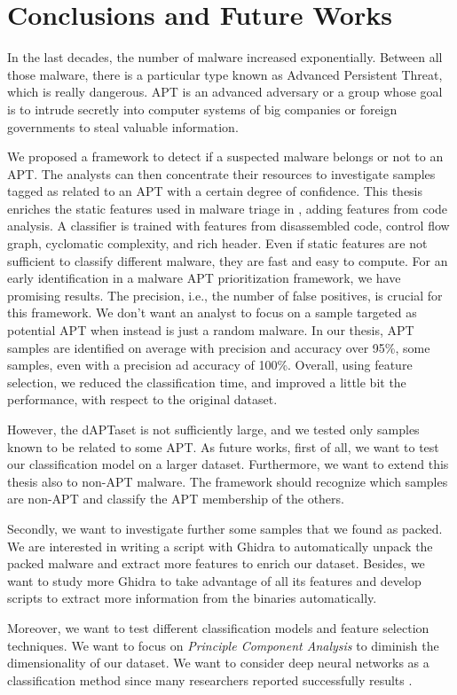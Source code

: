 \chapter{Conclusions and Future Works}
\label{ch:future}

In the last decades, the number of malware increased exponentially. Between all those malware, there is a particular type known as Advanced Persistent Threat, which is really dangerous. APT is an advanced adversary or a group whose goal is to intrude secretly into computer systems of big companies or foreign governments to steal valuable information. 

We proposed a framework to detect if a suspected malware belongs or not to an APT. The analysts can then concentrate their resources to investigate samples tagged as related to an APT with a certain degree of confidence. This thesis enriches the static features used in malware triage in \cite{laurenza2017malware}, adding features from code analysis. A classifier is trained with features from disassembled code, control flow graph, cyclomatic complexity, and rich header. Even if static features are not sufficient to classify different malware, they are fast and easy to compute. For an early identification in a malware APT prioritization framework, we have promising results. The precision, i.e., the number of false positives, is crucial for this framework. We don't want an analyst to focus on a sample targeted as potential APT when instead is just a random malware. In our thesis, APT samples are identified on average with precision and accuracy over 95\%, some samples, even with a precision ad accuracy of 100\%. Overall, using feature selection, we reduced the classification time, and improved a little bit the performance, with respect to the original dataset.

However, the dAPTaset is not sufficiently large, and we tested only samples known to be related to some APT.
As future works, first of all, we want to test our classification model on a larger dataset. Furthermore, we want to extend this thesis also to non-APT malware. The framework should recognize which samples are non-APT and classify the APT membership of the others. 

Secondly, we want to investigate further some samples that we found as packed. We are interested in writing a script with Ghidra to automatically unpack the packed malware and extract more features to enrich our dataset. Besides, we want to study more Ghidra to take advantage of all its features and develop scripts to extract more information from the binaries automatically.

Moreover, we want to test different classification models and feature selection techniques. We want to focus on \textit{Principle Component Analysis} to diminish the dimensionality of our dataset. We want to consider deep neural networks as a classification method since many researchers reported successfully results \cite{zhou2018malware} \cite{tobiyama2016malware}. 